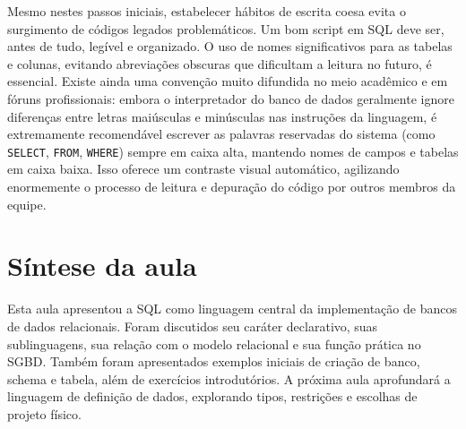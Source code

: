 Mesmo nestes passos iniciais, estabelecer hábitos de escrita coesa evita o surgimento de códigos legados problemáticos. Um bom script em SQL deve ser, antes de tudo, legível e organizado. O uso de nomes significativos para as tabelas e colunas, evitando abreviações obscuras que dificultam a leitura no futuro, é essencial. Existe ainda uma convenção muito difundida no meio acadêmico e em fóruns profissionais: embora o interpretador do banco de dados geralmente ignore diferenças entre letras maiúsculas e minúsculas nas instruções da linguagem, é extremamente recomendável escrever as palavras reservadas do sistema (como \texttt{SELECT}, \texttt{FROM}, \texttt{WHERE}) sempre em caixa alta, mantendo nomes de campos e tabelas em caixa baixa. Isso oferece um contraste visual automático, agilizando enormemente o processo de leitura e depuração do código por outros membros da equipe.

\section{Síntese da aula}

Esta aula apresentou a SQL como linguagem central da implementação de bancos de dados relacionais. Foram discutidos seu caráter declarativo, suas sublinguagens, sua relação com o modelo relacional e sua função prática no SGBD. Também foram apresentados exemplos iniciais de criação de banco, schema e tabela, além de exercícios introdutórios. A próxima aula aprofundará a linguagem de definição de dados, explorando tipos, restrições e escolhas de projeto físico.